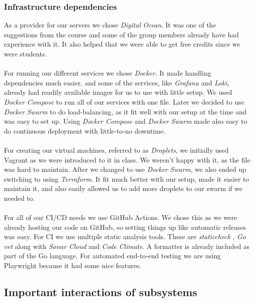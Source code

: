 \subsubsection{Infrastructure dependencies}
As a provider for our servers we chose \textit{Digital Ocean}. It was one of the suggestions from the course and some of the group members already have had experience with it. It also helped that we were able to get free credits since we were students.
\\
\\
For running our different services we chose \textit{Docker}. It made handling dependencies much easier, and some of the services, like \textit{Grafana} and \textit{Loki}, already had readily available images for us to use with little setup. We used \textit{Docker Compose} to run all of our services with one file. Later we decided to use \textit{Docker Swarm} to do load-balancing, as it fit well with our setup at the time and was easy to set up. Using \textit{Docker Compose} and \textit{Docker Swarm} made also easy to do continuous deployment with little-to-no downtime.
\\
\\
For creating our virtual machines, referred to as \textit{Droplets}, we initially used Vagrant as we were introduced to it in class. We weren't happy with it, as the file was hard to maintain. After we changed to use \textit{Docker Swarm}, we also ended up switching to using \textit{Terraform}. It fit much better with our setup, made it easier to maintain it, and also easily allowed us to add more droplets to our swarm if we needed to.
\\
\\
For all of our CI/CD needs we use GitHub Actions. We chose this as we were already hosting our code on GitHub, so setting things up like automatic releases was easy. For CI we use multiple static analysis tools. These are \textit{staticcheck} \cite{staticcheck}, \textit{Go vet} along with \textit{Sonar Cloud} and \textit{Code Climate}. A formatter is already included as part of the Go language. For automated end-to-end testing we are using Playwright because it had some nice features.

\subsection{Important interactions of subsystems}

